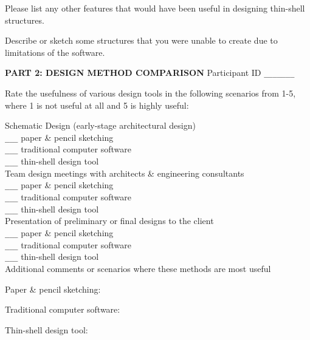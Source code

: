 \documentclass{thesis}
\begin{document}
\vspace{0.3in}

Please list any other features that would have been useful in designing thin-shell structures.
\vspace{1.2in}




Describe or sketch some structures that you were unable to create due to limitations of the software.
\vspace{1in}



\newpage
{\bf PART 2: DESIGN METHOD COMPARISON} 
\hfill Participant ID \verb+_______+
\vspace{0.3in}

Rate the usefulness of various design tools in the following scenarios from 1-5,
where 1 is not useful at all and 5 is highly useful:


Schematic Design (early-stage architectural design)\\
\verb+___+ paper \& pencil sketching \\
\verb+___+ traditional computer software \\
\verb+___+ thin-shell design tool \\
Team design meetings with architects \& engineering consultants\\
\verb+___+ paper \& pencil sketching \\
\verb+___+ traditional computer software \\
\verb+___+ thin-shell design tool \\
Presentation of preliminary or final designs to the client\\
\verb+___+ paper \& pencil sketching \\
\verb+___+ traditional computer software \\
\verb+___+ thin-shell design tool \\


Additional comments or scenarios where these methods are most useful
\vspace{0.15in}

\hspace*{0.3in} 
Paper \& pencil sketching:
\vspace{0.7in}

\hspace*{0.3in} 
Traditional computer software:
\vspace{0.7in}

\hspace*{0.3in} 
Thin-shell design tool:
\vspace{0.7in}
\end{document}
